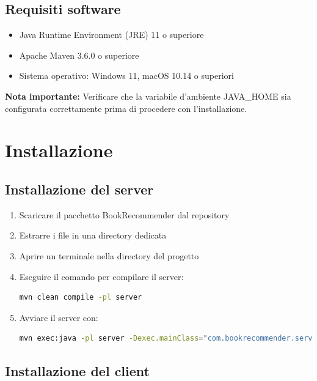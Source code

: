 \documentclass[12pt,a4paper]{article}
\begin{document}
\subsection{Requisiti software}
\begin{itemize}
    \item Java Runtime Environment (JRE) 11 o superiore
    \item Apache Maven 3.6.0 o superiore
    \item Sistema operativo: Windows 11, macOS 10.14 o superiori
\end{itemize}

\begin{infobox}
\textbf{Nota importante:} Verificare che la variabile d'ambiente JAVA\_HOME sia configurata correttamente prima di procedere con l'installazione.
\end{infobox}

\section{Installazione}

\subsection{Installazione del server}

\begin{enumerate}
    \item Scaricare il pacchetto BookRecommender dal repository
    \item Estrarre i file in una directory dedicata
    \item Aprire un terminale nella directory del progetto
    \item Eseguire il comando per compilare il server:
    
    \begin{lstlisting}[language=bash]
mvn clean compile -pl server
    \end{lstlisting}
    
    \item Avviare il server con:
    
    \begin{lstlisting}[language=bash]
mvn exec:java -pl server -Dexec.mainClass="com.bookrecommender.server.ServerMain"
    \end{lstlisting}
\end{enumerate}

\subsection{Installazione del client}
\end{document}
